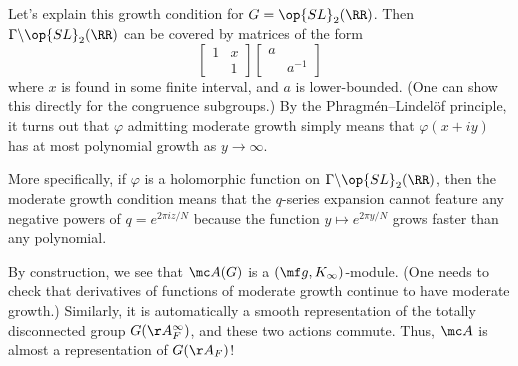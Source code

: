\documentclass[../notes.tex]{subfiles}
\begin{document}
\begin{example}
	Let's explain this growth condition for $G=\op{SL}_2(\RR)$. Then $\Gamma\backslash\op{SL}_2(\RR)$ can be covered by matrices of the form
	\[\begin{bmatrix}
		1 & x \\ & 1
	\end{bmatrix}\begin{bmatrix}
		a \\ & a^{-1}
	\end{bmatrix}\]
	where $x$ is found in some finite interval, and $a$ is lower-bounded. (One can show this directly for the congruence subgroups.) By the Phragm\'en--Lindel\"of principle, it turns out that $\varphi$ admitting moderate growth simply means that $\varphi(x+iy)$ has at most polynomial growth as $y\to\infty$.
\end{example}
\begin{example}
	More specifically, if $\varphi$ is a holomorphic function on $\Gamma\backslash\op{SL}_2(\RR)$, then the moderate growth condition means that the $q$-series expansion cannot feature any negative powers of $q=e^{2\pi iz/N}$ because the function $y\mapsto e^{2\pi y/N}$ grows faster than any polynomial.
\end{example}
By construction, we see that $\mc A(G)$ is a $(\mf g,K_\infty)$-module. (One needs to check that derivatives of functions of moderate growth continue to have moderate growth.) Similarly, it is automatically a smooth representation of the totally disconnected group $G(\AA^\infty_F)$, and these two actions commute. Thus, $\mc A$ is almost a representation of $G(\AA_F)$!
\end{document}
